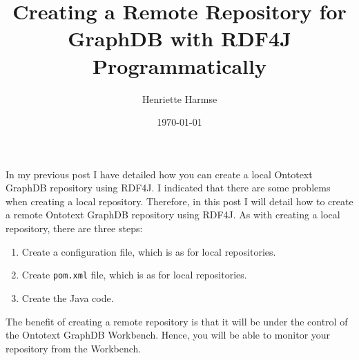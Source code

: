 \documentclass{amsart}
\title{Creating a Remote Repository for GraphDB with RDF4J Programmatically}
\author{Henriette Harmse}
\date{\today}
\begin{document}
  \maketitle
  In my previous post I have detailed how you can create a local Ontotext GraphDB repository using RDF4J. I indicated that there are some problems when creating a local repository. Therefore, in this post I will detail how to create a remote Ontotext GraphDB repository using RDF4J. As with creating a local repository, there are three steps:
  \begin{enumerate}
    \item Create a configuration file, which is as for local repositories.
    \item Create \texttt{pom.xml} file, which is as for local repositories.
    \item Create the Java code.
  \end{enumerate}
  The benefit of creating a remote repository is that it will be under the control of the Ontotext GraphDB Workbench. Hence, you will be able to monitor your repository from the Workbench.
  
\end{document}
